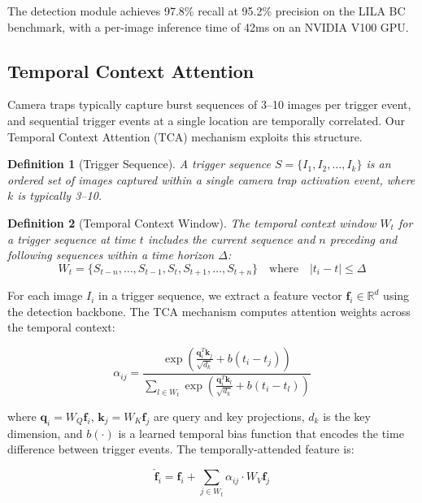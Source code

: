 \documentclass[11pt,letterpaper]{article}
\newtheorem{definition}{Definition}[section]
\begin{document}
The detection module achieves 97.8\% recall at 95.2\% precision on the LILA BC benchmark, with a per-image inference time of 42ms on an NVIDIA V100 GPU.

\subsection{Temporal Context Attention}

Camera traps typically capture burst sequences of 3--10 images per trigger event, and sequential trigger events at a single location are temporally correlated. Our Temporal Context Attention (TCA) mechanism exploits this structure.

\begin{definition}[Trigger Sequence]
A trigger sequence $S = \{I_1, I_2, \ldots, I_k\}$ is an ordered set of images captured within a single camera trap activation event, where $k$ is typically 3--10.
\end{definition}

\begin{definition}[Temporal Context Window]
The temporal context window $W_t$ for a trigger sequence at time $t$ includes the current sequence and $n$ preceding and following sequences within a time horizon $\Delta$:
\begin{equation}
W_t = \{S_{t-n}, \ldots, S_{t-1}, S_t, S_{t+1}, \ldots, S_{t+n}\} \quad \text{where} \quad |t_i - t| \leq \Delta
\end{equation}
\end{definition}

For each image $I_i$ in a trigger sequence, we extract a feature vector $\mathbf{f}_i \in \mathbb{R}^d$ using the detection backbone. The TCA mechanism computes attention weights across the temporal context:

\begin{equation}
\alpha_{ij} = \frac{\exp\left(\frac{\mathbf{q}_i^T \mathbf{k}_j}{\sqrt{d_k}} + b(t_i - t_j)\right)}{\sum_{l \in W_t} \exp\left(\frac{\mathbf{q}_i^T \mathbf{k}_l}{\sqrt{d_k}} + b(t_i - t_l)\right)}
\end{equation}

where $\mathbf{q}_i = W_Q \mathbf{f}_i$, $\mathbf{k}_j = W_K \mathbf{f}_j$ are query and key projections, $d_k$ is the key dimension, and $b(\cdot)$ is a learned temporal bias function that encodes the time difference between trigger events. The temporally-attended feature is:

\begin{equation}
\hat{\mathbf{f}}_i = \mathbf{f}_i + \sum_{j \in W_t} \alpha_{ij} \cdot W_V \mathbf{f}_j
\end{equation}
\end{document}
